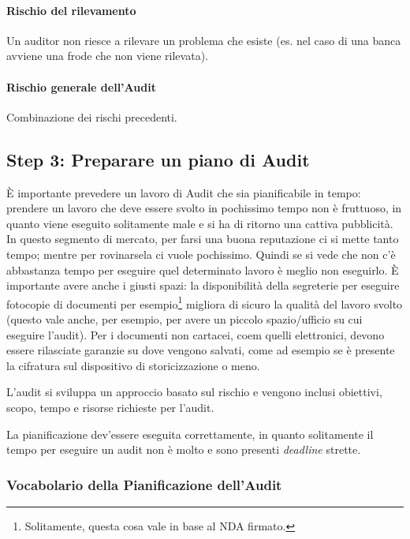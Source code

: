 \paragraph*{Rischio del rilevamento}

Un auditor non riesce a rilevare un problema che esiste (es. nel caso 
di una banca avviene una frode che non viene rilevata).

\paragraph*{Rischio generale dell'Audit}

Combinazione dei rischi precedenti.


\subsection{Step 3: Preparare un piano di Audit}

È importante prevedere un lavoro di Audit che sia pianificabile in tempo: 
prendere un lavoro che deve essere svolto in pochissimo tempo non è 
fruttuoso, in quanto viene eseguito solitamente male e si ha di 
ritorno una cattiva pubblicità. In questo segmento di mercato, per farsi una buona 
reputazione ci si mette tanto tempo; mentre per rovinarsela ci vuole pochissimo. 
Quindi se si vede che non c'è abbastanza tempo per eseguire quel determinato 
lavoro è meglio non eseguirlo. 
È importante avere anche i giusti spazi: la disponibilità della segreterie per 
eseguire fotocopie di documenti per esempio\footnote{Solitamente, questa cosa 
vale in base al NDA firmato.} migliora di sicuro la qualità del lavoro svolto 
(questo vale anche, per esempio, per avere un piccolo spazio/ufficio su cui 
eseguire l'audit). Per i documenti non cartacei, coem quelli elettronici, 
devono essere rilasciate garanzie su dove vengono salvati, come ad esempio se è 
presente la cifratura sul dispositivo di storicizzazione o meno.

L'audit si sviluppa un approccio basato sul rischio e vengono inclusi 
obiettivi, scopo, tempo e risorse richieste per l'audit.

La pianificazione dev'essere eseguita correttamente, in quanto solitamente il 
tempo per eseguire un audit non è molto e sono presenti \textit{deadline} 
strette.

\subsubsection{Vocabolario della Pianificazione dell'Audit}


